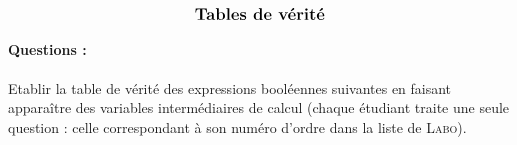 \documentclass[11pt,a4paper]{article}
\begin{document}
\entete

\autoevaluation


$$\mbox{\textbf{\large Tables de vérité}}$$


\paragraph{Questions :}
Etablir la table de vérité des expressions booléennes suivantes en faisant apparaître des variables intermédiaires de calcul
(chaque étudiant traite une seule question : celle correspondant à son numéro d'ordre dans la liste de \textsc{Labo}).
\end{document}
